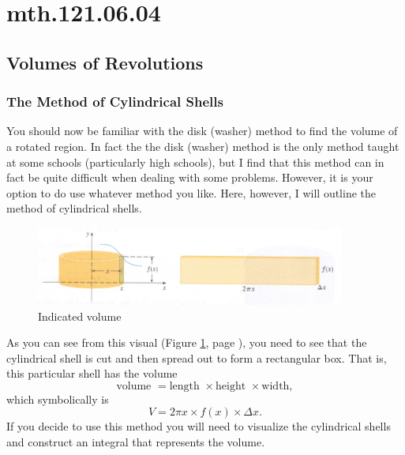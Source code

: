 \documentclass[12pt,addpoints, answers, fleqn]{exam}
\begin{document}
\vfill
\pagebreak


\section{mth.121.06.04}
\subsection{Volumes of Revolutions}

\subsubsection{The Method of Cylindrical Shells}

You should now be familiar with the disk (washer) method to find the volume of a rotated region. In fact the the disk (washer) method is the only method taught at some schools (particularly high schools), but I find that this method can in fact be quite difficult when dealing with some problems. However, it is your option to do use whatever method you like. Here, however, I will outline the method of cylindrical shells.

\begin{figure}[htbp] %
   \centering
   \includegraphics[width=4in]{./graphics/graph3111.pdf} 
   \caption{Indicated volume}
   \label{fig:graph3111}
\end{figure}

As you can see from this visual (Figure \ref{fig:graph3111}, page \pageref{fig:graph3111}), you need to see that the cylindrical shell is cut and then spread out to form a rectangular box. That is, this particular shell has the volume
\[
\mbox{volume } =  \mbox{length } \times \mbox{height } \times \mbox{width},
\]
which symbolically is
\[
V =  2 \pi x \times f\left( x \right) \times \Delta x.
\]
If you decide to use this method you will need to visualize the cylindrical shells and construct an integral that represents the volume. 
\end{document}
